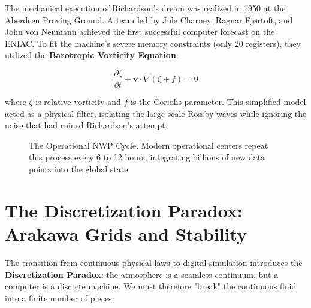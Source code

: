 The mechanical execution of Richardson's dream was realized in 1950 at the Aberdeen Proving Ground. A team led by Jule Charney, Ragnar Fjørtoft, and John von Neumann achieved the first successful computer forecast on the ENIAC. To fit the machine’s severe memory constraints (only 20 registers), they utilized the \textbf{Barotropic Vorticity Equation}:

\begin{equation}
\frac{\partial \zeta}{\partial t} + \mathbf{v} \cdot \nabla (\zeta + f) = 0
\end{equation}

where $\zeta$ is relative vorticity and $f$ is the Coriolis parameter. This simplified model acted as a physical filter, isolating the large-scale Rossby waves while ignoring the noise that had ruined Richardson’s attempt. 

\begin{figure}[H]
\centering
{}
\caption{The Operational NWP Cycle. Modern operational centers repeat this process every 6 to 12 hours, integrating billions of new data points into the global state.}
\label{fig:nwp_cycle_tikz}
\end{figure}

\section{The Discretization Paradox: Arakawa Grids and Stability}

The transition from continuous physical laws to digital simulation introduces the \textbf{Discretization Paradox}: the atmosphere is a seamless continuum, but a computer is a discrete machine. We must therefore "break" the continuous fluid into a finite number of pieces. 

